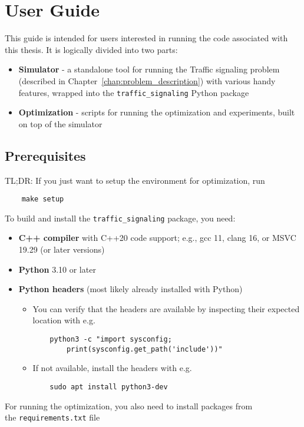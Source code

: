 \chapter{User Guide} \label{chap:user_guide}

This guide is intended for users interested in running the code associated with this thesis. It is logically divided into two parts:
\begin{itemize}
    \item \textbf{Simulator} - a standalone tool for running the Traffic signaling problem (described in Chapter~\ref{chap:problem_description}) with various handy features, wrapped into the \verb|traffic_signaling| Python package 
    \item \textbf{Optimization} - scripts for running the optimization and experiments, built on top of the simulator
\end{itemize}

\section{Prerequisites}

TL;DR: If you just want to setup the environment for optimization, run
\begin{verbatim}
    make setup
\end{verbatim}

To build and install the \verb|traffic_signaling| package, you need:
\begin{itemize}
    \item \textbf{C++ compiler} with C++20 code support; e.g., gcc 11, clang 16, or MSVC 19.29 (or later versions)
    \item \textbf{Python} 3.10 or later
    \item \textbf{Python headers} (most likely already installed with Python)
    \begin{itemize}
        \item You can verify that the headers are available by inspecting their expected location with e.g.
\begin{verbatim}
    python3 -c "import sysconfig;
        print(sysconfig.get_path('include'))"
\end{verbatim}
        \item If not available, install the headers with e.g.
\begin{verbatim}
    sudo apt install python3-dev
\end{verbatim}
    \end{itemize}
\end{itemize}
For running the optimization, you also need to install packages from \\
the \verb|requirements.txt| file
